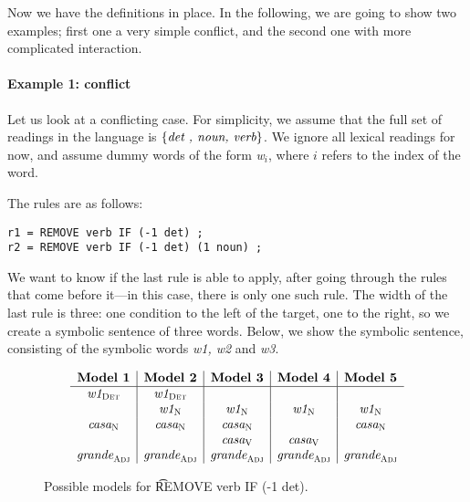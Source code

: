 
Now we have the definitions in place. In the following, we are going to show two examples; first one a very simple conflict, and the second one with more complicated interaction.


\paragraph{Example 1: conflict}

Let us look at a conflicting case. For simplicity, we assume that the
full set of readings in the language is $\{ \emph{det , noun, verb} \}$. We ignore all lexical readings for now, and assume dummy words of the form \emph{w$_{i}$}, where $i$ refers to the index of the word.

The rules are as follows:


\begin{verbatim}
r1 = REMOVE verb IF (-1 det) ;
r2 = REMOVE verb IF (-1 det) (1 noun) ;
\end{verbatim}


We want to know if the last rule is able to apply, after going through the rules that come before it---in this case, there is only one such rule. 
The width of the last rule is three: one condition to the left of the target, one to the right, so we create a symbolic sentence of three words. Below, we show the symbolic sentence, consisting of the symbolic words {\em w1, w2} and {\em w3}.

\begin{figure}[h]
\centering
$$\begin{array}{ c | c | c | c | c}
\textbf{Model 1}  & \textbf{Model 2}  & \textbf{Model 3} & \textbf{Model 4} & \textbf{Model 5} \\ \hline
 \wOne_{\det}   &  \wOne_{\det}  &         &        &        \\
          &  \wOne_{\noun}  & \wOne_{\noun}  & \wOne_{\noun} & \wOne_{\noun} \\
 \casaN   &  \casaN  & \casaN  &        & \casaN \\
          &          & \casaV  & \casaV &         \\
\grandeAdj & \grandeAdj & \grandeAdj & \grandeAdj & \grandeAdj \\

\end{array}$$
\caption{Possible models for \t{REMOVE verb IF (-1 det)}.}
\label{fig:modelsOneRule}
\end{figure}

